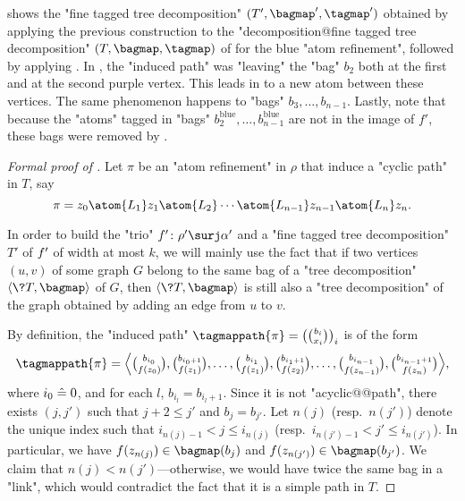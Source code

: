  shows the "fine tagged tree decomposition" $(T',\bagmap',\tagmap')$
obtained by applying the previous construction to the "decomposition@fine tagged tree decomposition"
$(T, \bagmap, \tagmap)$ of  for the blue "atom refinement",
followed by applying .
In , the "induced path" was "leaving" the "bag" $b_2$ both
at the first and at the second purple vertex. This leads in 
to a new atom between these vertices. The same phenomenon happens to "bags" $b_3, \hdots, b_{n-1}$.
Lastly, note that because the "atoms" tagged in "bags"
$b^{\text{blue}}_2, \hdots, b^{\text{blue}}_{n-1}$ are not in the image of $f'$,
these bags were removed by .

\begin{proof}[Formal proof of ]
    Let $\pi$ be an "atom refinement" in $\rho$ that induce a "cyclic path" in $T$,
    say
    \[
      \pi = z_0 \atom{L_1} z_1 \atom{L_2} \dotsb \atom{L_{n-1}} z_{n-1} \atom{L_n} z_n.
    \]

    In order to build the "trio" $\fun'\colon \rho' \surj \alpha'$
    and a "fine tagged tree decomposition" $T'$ of $f'$ of width at most $k$,
    we will mainly use the fact that if two vertices $(u,v)$ of some graph $G$
    belong to the same bag of a "tree decomposition" $\tup{\?T, \bagmap}$ of $G$, then
    $\tup{\?T, \bagmap}$ is still also a "tree decomposition" of the graph obtained by adding an edge from $u$ to $v$.
    
    By definition, the "induced path" $\tagmappath{\pi} = \bigl({b_i \choose x_i}\bigr)_i$
	is of the form
    \[
        \tagmappath{\pi} =
        \textstyle{
        \Bigl\langle
            {b_{i_0} \choose \fun(z_0)},
			{b_{i_0+1} \choose \fun(z_1)},
			\hdots,
			{b_{i_1} \choose \fun(z_1)},
			{b_{i_1+1} \choose \fun(z_2)},
			\hdots,
			{b_{i_{n-1}} \choose \fun(z_{n-1})},
			{b_{i_{n-1}+1} \choose \fun(z_n)}
        \Bigr\rangle
        },
    \]
	where $i_0 \mathrel{\hat{=}} 0$, and for each $l$, $b_{i_l} = b_{i_l+1}$.
    Since it is not "acyclic@@path", there exists $(j, j')$ such that
    $j + 2 \leq  j'$ and $b_j = b_{j'}$.
    Let $n(j)$ (resp.\ $n(j')$) denote the unique index such that
    $i_{n(j)-1} < j \leq i_{n(j)}$ (resp.\ $i_{n(j')-1} < j' \leq i_{n(j')}$).
    In particular, we have $\fun(z_{n(j)}) \in \bagmap(b_j)$
    and $\fun(z_{n(j')}) \in \bagmap(b_{j'})$.
    We claim that $n(j) < n(j')$---otherwise, we would have twice the same
	bag in a "link", which would contradict the fact that it is a simple path in $T$.
  

\end{proof}
